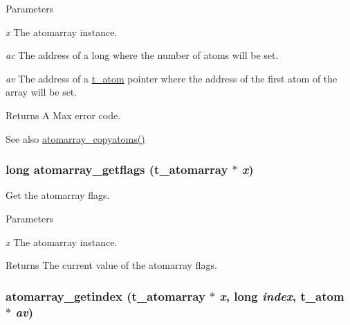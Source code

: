 \begin{DoxyParams}{Parameters}
\item[{\em x}]The atomarray instance. \item[{\em ac}]The address of a long where the number of atoms will be set. \item[{\em av}]The address of a \hyperlink{structt__atom}{t\_\-atom} pointer where the address of the first atom of the array will be set. \end{DoxyParams}
\begin{DoxyReturn}{Returns}
A Max error code.
\end{DoxyReturn}
\begin{DoxySeeAlso}{See also}
\hyperlink{group__atomarray_gaec25ec428f6bb7b1a1c8092b5c01f2c2}{atomarray\_\-copyatoms()} 
\end{DoxySeeAlso}
\hypertarget{group__atomarray_gae784ffaf3fce1cd4967046faf4c7a377}{
\subsubsection[{atomarray\_\-getflags}]{\setlength{\rightskip}{0pt plus 5cm}long atomarray\_\-getflags ({\bf t\_\-atomarray} $\ast$ {\em x})}}
\label{group__atomarray_gae784ffaf3fce1cd4967046faf4c7a377}


Get the atomarray flags. 
\begin{DoxyParams}{Parameters}
\item[{\em x}]The atomarray instance. \end{DoxyParams}
\begin{DoxyReturn}{Returns}
The current value of the atomarray flags. 
\end{DoxyReturn}
\hypertarget{group__atomarray_ga1ee643830e94d84c325fd8caa4db9d4b}{
\subsubsection[{atomarray\_\-getindex}]{ atomarray\_\-getindex ({\bf t\_\-atomarray} $\ast$ {\em x}, \/  long {\em index}, \/  {\bf t\_\-atom} $\ast$ {\em av})}}
\label{group__atomarray_ga1ee643830e94d84c325fd8caa4db9d4b}


